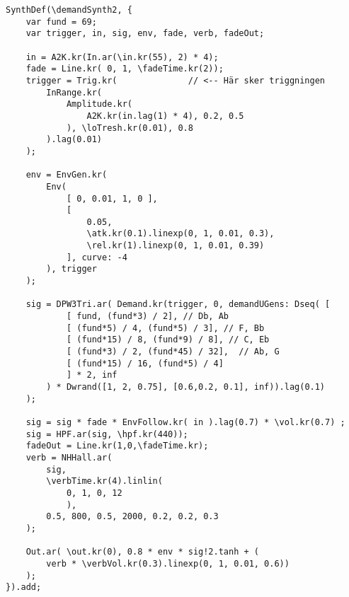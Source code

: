 \documentclass{article}
\renewcommand{\baselinestretch}{1.5}
\begin{document}
\renewcommand{\baselinestretch}{1}
\begin{lstlisting}[style=SuperCollider-IDE, caption=SynthDef för amplitudtriggning från Koltrast]
SynthDef(\demandSynth2, {
	var fund = 69;
	var trigger, in, sig, env, fade, verb, fadeOut;

	in = A2K.kr(In.ar(\in.kr(55), 2) * 4);
	fade = Line.kr( 0, 1, \fadeTime.kr(2));
	trigger = Trig.kr(			    // <-- Här sker triggningen
		InRange.kr( 
			Amplitude.kr(
				A2K.kr(in.lag(1) * 4), 0.2, 0.5
			), \loTresh.kr(0.01), 0.8 
		).lag(0.01)
	);

	env = EnvGen.kr(
		Env( 
			[ 0, 0.01, 1, 0 ],
			[
				0.05,
				\atk.kr(0.1).linexp(0, 1, 0.01, 0.3),
				\rel.kr(1).linexp(0, 1, 0.01, 0.39) 
			], curve: -4
		), trigger
	);

	sig = DPW3Tri.ar( Demand.kr(trigger, 0, demandUGens: Dseq( [ 
			[ fund, (fund*3) / 2], // Db, Ab
			[ (fund*5) / 4, (fund*5) / 3], // F, Bb
			[ (fund*15) / 8, (fund*9) / 8], // C, Eb
			[ (fund*3) / 2, (fund*45) / 32],  // Ab, G
			[ (fund*15) / 16, (fund*5) / 4]
			] * 2, inf
		) * Dwrand([1, 2, 0.75], [0.6,0.2, 0.1], inf)).lag(0.1)
	);

	sig = sig * fade * EnvFollow.kr( in ).lag(0.7) * \vol.kr(0.7) ;
	sig = HPF.ar(sig, \hpf.kr(440));
	fadeOut = Line.kr(1,0,\fadeTime.kr);
	verb = NHHall.ar(
		sig, 
		\verbTime.kr(4).linlin(
			0, 1, 0, 12
			), 
		0.5, 800, 0.5, 2000, 0.2, 0.2, 0.3
	);

	Out.ar( \out.kr(0), 0.8 * env * sig!2.tanh + ( 
		verb * \verbVol.kr(0.3).linexp(0, 1, 0.01, 0.6))
	);  
}).add;
\end{lstlisting}
\renewcommand{\baselinestretch}{1.5}




\end{document}
